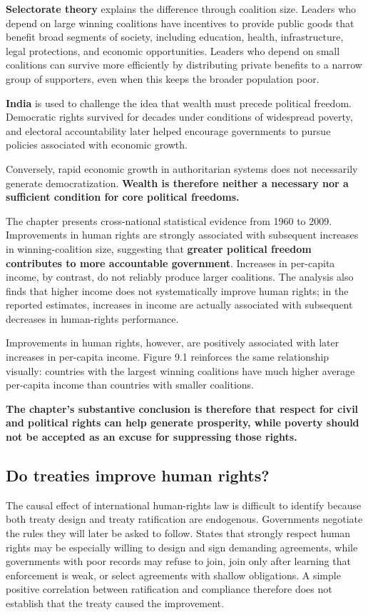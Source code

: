 \textbf{Selectorate theory} explains the difference through coalition size. Leaders who depend on large winning coalitions have incentives to provide public goods that benefit broad segments of society, including education, health, infrastructure, legal protections, and economic opportunities. Leaders who depend on small coalitions can survive more efficiently by distributing private benefits to a narrow group of supporters, even when this keeps the broader population poor.

\textbf{India} is used to challenge the idea that wealth must precede political freedom. Democratic rights survived for decades under conditions of widespread poverty, and electoral accountability later helped encourage governments to pursue policies associated with economic growth.

Conversely, rapid economic growth in authoritarian systems does not necessarily generate democratization. \textbf{Wealth is therefore neither a necessary nor a sufficient condition for core political freedoms.}

The chapter presents cross-national statistical evidence from 1960 to 2009. Improvements in human rights are strongly associated with subsequent increases in winning-coalition size, suggesting that \textbf{greater political freedom contributes to more accountable government}. Increases in per-capita income, by contrast, do not reliably produce larger coalitions. The analysis also finds that higher income does not systematically improve human rights; in the reported estimates, increases in income are actually associated with subsequent decreases in human-rights performance.

Improvements in human rights, however, are positively associated with later increases in per-capita income. Figure 9.1 reinforces the same relationship visually: countries with the largest winning coalitions have much higher average per-capita income than countries with smaller coalitions.

\textbf{The chapter's substantive conclusion is therefore that respect for civil and political rights can help generate prosperity, while poverty should not be accepted as an excuse for suppressing those rights.}

\subsection{Do treaties improve human rights?}

The causal effect of international human-rights law is difficult to identify because both treaty design and treaty ratification are endogenous. Governments negotiate the rules they will later be asked to follow. States that strongly respect human rights may be especially willing to design and sign demanding agreements, while governments with poor records may refuse to join, join only after learning that enforcement is weak, or select agreements with shallow obligations. A simple positive correlation between ratification and compliance therefore does not establish that the treaty caused the improvement.

